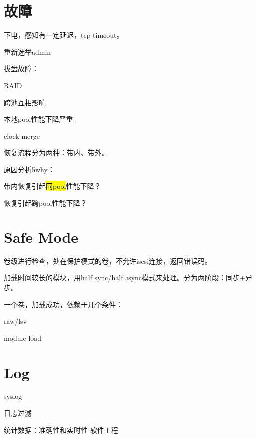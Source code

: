 \section{故障}

下电，感知有一定延迟，tcp timeout。

重新选举admin

拔盘故障：
\begin{enumbox}
\item RAID
\item 跨池互相影响
\item 本地pool性能下降严重
\item clock merge
\end{enumbox}

恢复流程分为两种：带内、带外。

原因分析5why：
\begin{enumbox}
\item 带内恢复引起\hl{同pool}性能下降？
\item 恢复引起跨pool性能下降？
\end{enumbox}

\section{Safe Mode}

卷级进行检查，处在保护模式的卷，不允许iscsi连接，返回错误码。

加载时间较长的模块，用half sync/half async模式来处理。分为两阶段：同步+异步。

一个卷，加载成功，依赖于几个条件：
\begin{compactitem}
\item raw/lsv
\item module load
\end{compactitem}

\section{Log}

syslog

日志过滤

统计数据：准确性和实时性
软件工程
